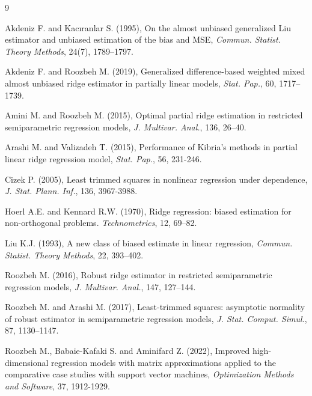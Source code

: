 \documentclass[10pt,twoside]{article}
\numberwithin{equation}{section}
\begin{document}
\begin{thebibliography}{9}

 Akdeniz F. and Kacıranlar S. (1995), On the almost unbiased generalized Liu estimator and unbiased estimation of the bias and MSE, {\it Commun. Statist. Theory Methods}, 24(7), 1789–1797.

 Akdeniz F. and Roozbeh M. (2019), Generalized difference-based weighted mixed almost unbiased ridge estimator in partially linear models, {\it Stat. Pap.}, 60, 1717–1739.

 Amini M. and Roozbeh M. (2015), Optimal partial ridge estimation in restricted semiparametric regression models, {\it J. Multivar. Anal.}, 136, 26–40.

 Arashi M. and Valizadeh T. (2015), Performance of Kibria’s methods in partial linear ridge regression model, {\it Stat. Pap.}, 56, 231-246.



 Cizek P. (2005), Least trimmed squares in nonlinear regression under dependence, {\it J. Stat. Plann. Inf.}, {136}, 3967-3988.



 Hoerl A.E. and Kennard R.W. (1970), Ridge regression: biased estimation for non-orthogonal problems. {\it Technometrics}, 12, 69–82.



 Liu K.J. (1993), A new class of biased estimate in linear regression, {\it Commun. Statist. Theory Methods}, 22, 393–402.



 Roozbeh M. (2016), Robust ridge estimator in restricted semiparametric regression models, {\it J. Multivar. Anal.}, 147, 127–144.

 Roozbeh M. and Arashi M. (2017), Least-trimmed squares: asymptotic normality of robust estimator in semiparametric regression models, {\it J. Stat. Comput. Simul.}, 87, 1130–1147.

 Roozbeh M., Babaie-Kafaki S. and Aminifard Z. (2022), Improved high-dimensional regression models with matrix approximations applied to the comparative case studies with support vector machines, {\it Optimization Methods and Software}, 37, 1912-1929.


\end{thebibliography}
\end{document}
